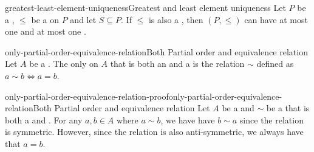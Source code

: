 \documentclass[preview]{standalone}
\begin{document}

%
%
%

\begin{snippetcorollary}{greatest-least-element-uniqueness}{Greatest and least element uniqueness}
    Let \(P\) be a \set, \(\leq\) be a \preorder on \(P\) and let \(S\subseteq P\).
    If \(\leq\) is also a \partialorder, then \((P, \leq)\) can have at most one \greatestelement
    and at most one \leastelement.
\end{snippetcorollary}


\begin{snippettheorem}{only-partial-order-equivalence-relation}{Both Partial order and equivalence relation}
    Let \(A\) be a \set. The only \binrelation on \(A\) that is both an
    \equivrelation and a \partialorder is the relation \(\sim\) defined as
    \(a \sim b \iff a = b\).
\end{snippettheorem}

\begin{snippetproof}{only-partial-order-equivalence-relation-proof}{only-partial-order-equivalence-relation}{Both Partial order and equivalence relation}
    Let \(A\) be a \set and \(\sim\) be a \binrelation that is both a \partialorder and \equivrelation.
    For any \(a,b\in A\) where \(a\sim b\), we have have \(b\sim a\) since the relation is symmetric.
    However, since the relation is also anti-symmetric, we always have that \(a=b\).
\end{snippetproof}
\end{document}
